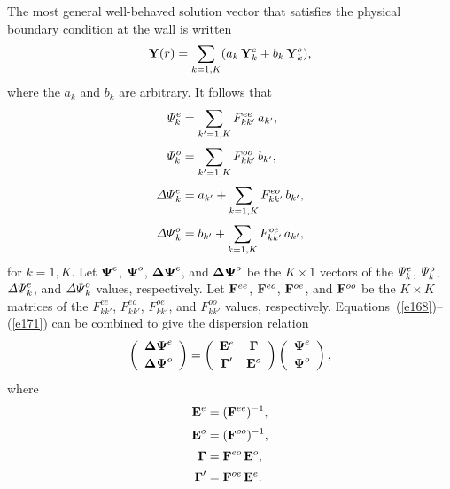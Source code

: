 \documentclass[12pt,prb,aps,notitlepage]{revtex4-1}
\newcommand {\bPsi} {\mbox{\boldmath$\Psi$}}
\newcommand {\bDelta} {\mbox{\boldmath$\Delta$}}
\newcommand {\bGamma} {\mbox{\boldmath$\Gamma$}}
\begin{document}
The most general well-behaved solution vector that satisfies the physical boundary condition at the wall is written
\begin{equation}
{\bf Y}(r) = \sum_{k=1,K} (a_k\,{\bf Y}_k^e + b_k\,{\bf Y}_k^o),
\end{equation}
where the $a_k$ and $b_k$ are arbitrary. 
It follows that
\begin{align}\label{e168}
{\mit\Psi}_{k}^e &=\sum_{k'=1,K} F_{kk'}^{ee}\,a_{k'},\\[0.5ex]
{\mit\Psi}_{k}^o &=\sum_{k'=1,K} F_{kk'}^{oo}\,b_{k'},\\[0.5ex]
{\mit\Delta\Psi}_{k}^e &= a_{k'} + \sum_{k=1,K} F_{kk'}^{eo}\,b_{k'},\\[0.5ex]
{\mit\Delta\Psi}_{k}^o &= b_{k'} + \sum_{k=1,K} F_{kk'}^{oe}\,a_{k'},\label{e171}
\end{align}
for $k=1,K$. 
Let $\bPsi^e$, $\bPsi^o$, $\bDelta\bPsi^e$, and $\bDelta\bPsi^o$ be the $K\times 1$ vectors of the ${\mit\Psi}^e_k$, ${\mit\Psi}^o_k$,
${\mit\Delta\Psi}^e_k$, and ${\mit\Delta\Psi}^o_k$ values, respectively. Let ${\bf F}^{ee}$, ${\bf F}^{eo}$, ${\bf F}^{oe}$,
and ${\bf F}^{oo}$ be the $K\times K$ matrices of the $F^{ee}_{kk'}$, $F^{eo}_{kk'}$, $F^{oe}_{kk'}$, and $F^{oo}_{kk'}$
values, respectively.  Equations~(\ref{e168})--(\ref{e171}) can be combined to give the dispersion relation 
\begin{equation}\label{e186}
\left(\begin{array}{c} \bDelta\bPsi^e\\[0.5ex] \bDelta\bPsi^o\end{array}\right)=
\left(\begin{array}{cc} {\bf E}^e & \bGamma\\[0.5ex]
\bGamma' & {\bf E}^o\end{array}\right)\left(\begin{array}{c} \bPsi^e\\[0.5ex] \bPsi^o\end{array}\right),
\end{equation}
where 
\begin{align}
{\bf E}^e &= ({\bf F}^{ee})^{-1},\\[0.5ex]
{\bf E}^o &= ({\bf F}^{oo})^{-1},\\[0.5ex]
\bGamma &= {\bf F}^{eo}\,{\bf E}^o,\\[0.5ex]
\bGamma' &= {\bf F}^{oe}\,{\bf E}^e.
\end{align}
\end{document}

